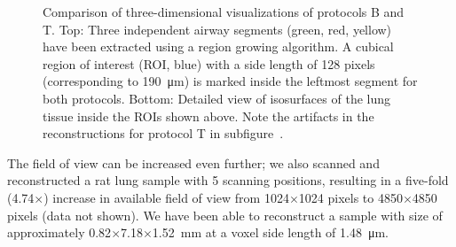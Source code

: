 \begin{figure}[htp]
{%
			}%
		\caption{Comparison of three-dimensional visualizations of protocols B and T. Top: Three independent airway segments (green, red, yellow) have been extracted using a region growing algorithm. A cubical region of interest (ROI, blue) with a side length of 128 pixels (corresponding to \SI{190}{\micro\meter}) is marked inside the leftmost segment for both protocols. Bottom: Detailed view of isosurfaces of the lung tissue inside the ROIs shown above. Note the artifacts in the reconstructions for protocol T in subfigure~.}%
		\label{fig:BvsT}%
	\end{figure}
\fi

The field of view can be increased even further; we also scanned and reconstructed a rat lung sample with 5 scanning positions, resulting in a five-fold (4.74$\times$) increase in available field of view from 1024$\times$1024 pixels to 4850$\times$4850 pixels (data not shown). We have been able to reconstruct a sample with size of approximately 0.82$\times$7.18$\times$\SI{1.52}{\milli\meter} at a voxel side length of \SI{1.48}{\micro\meter}.